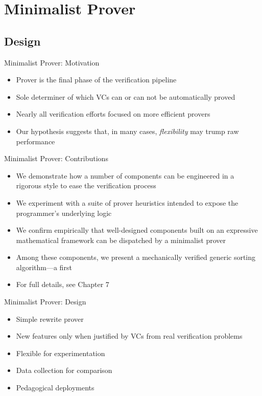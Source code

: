 \section{Minimalist Prover}

\subsection{Design}
\begin{frame}{Minimalist Prover: Motivation}
	\begin{itemize}
		\item Prover is the final phase of the verification pipeline
		\item Sole determiner of which VCs can or can not be automatically proved
		\item Nearly all verification efforts focused on more efficient provers
		\item Our hypothesis suggests that, in many cases, \emph{flexibility} may trump raw performance
	\end{itemize}
\end{frame}

\begin{frame}{Minimalist Prover: Contributions}
	\begin{itemize}
		\item We demonstrate how a number of components can be engineered in a rigorous style to ease the verification process
		\item We experiment with a suite of prover heuristics intended to expose the programmer's underlying logic
		\item We confirm empirically that well-designed components built on an expressive mathematical framework can be dispatched by a minimalist prover
		\item Among these components, we present a mechanically verified generic sorting algorithm---a first
		\item For full details, see Chapter 7
	\end{itemize}
\end{frame}

\begin{frame}{Minimalist Prover: Design}
	\begin{itemize}
		\item Simple rewrite prover
		\item New features only when justified by VCs from real verification problems
		\item Flexible for experimentation
		\item Data collection for comparison
		\item Pedagogical deployments
	\end{itemize}
\end{frame}


